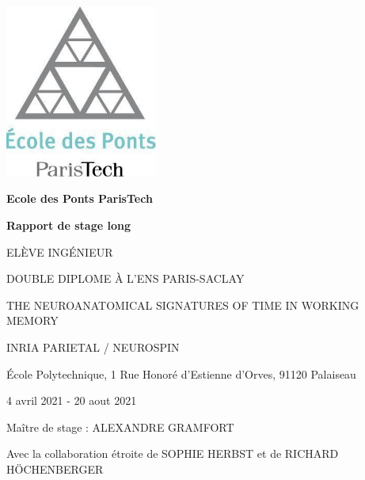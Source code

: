 \begin{titlepage}
    \begin{center}
        
        
        \includegraphics[width=5cm]{preliminaries/images/logo_ponts.jpg}
        
        \vspace{0.5cm}
        
        \textbf{Ecole des Ponts ParisTech}

        \vspace{1.5cm}
        
        \textbf{\Large Rapport de stage long}
        
        \vspace{0.5cm}
        
        \MakeUppercase{\theauthor{}}
        
        \MakeUppercase{Elève ingénieur}
        
        \MakeUppercase{Double diplome à l'ENS Paris-Saclay}
        
        \vspace{1.5cm}
        
        \MakeUppercase{\Large The neuroanatomical signatures of time in working memory}
        
    
        
        
        
        \vfill
        
        \MakeUppercase{INRIA Parietal / Neurospin}
        
        École Polytechnique, 1 Rue Honoré d'Estienne d'Orves, 91120 Palaiseau
        
        4 avril 2021 - 20 aout 2021
        
        Maître de stage : \MakeUppercase{Alexandre Gramfort}
        
        Avec la collaboration étroite de \MakeUppercase{Sophie Herbst} et de \MakeUppercase{Richard Höchenberger}


        


        
    
        
    \end{center}
\end{titlepage}
